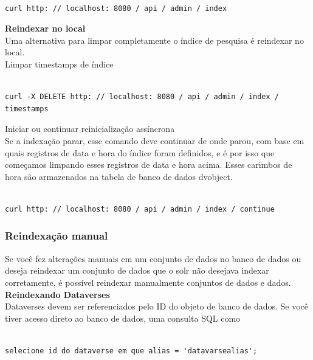 \documentclass[12pt,hidelinks]{article}
\begin{document}
\begin{verbatim}

curl http: // localhost: 8080 / api / admin / index

\end{verbatim}

\textbf{Reindexar no local}\\

Uma alternativa para limpar completamente o índice de pesquisa é reindexar no local.\\

Limpar timestamps de índice

\begin{verbatim}

curl -X DELETE http: // localhost: 8080 / api / admin / index / 
timestamps

\end{verbatim}

Iniciar ou continuar reinicialização assíncrona\\

Se a indexação parar, esse comando deve continuar de onde parou, com base em quais registros de data e hora do índice foram definidos, e é por isso que começamos limpando esses registros de data e hora acima. Esses carimbos de hora são armazenados na tabela de banco de dados dvobject.

\begin{verbatim}

curl http: // localhost: 8080 / api / admin / index / continue

\end{verbatim}

\subsubsection{Reindexação manual}

\qquad Se você fez alterações manuais em um conjunto de dados no banco de dados ou deseja reindexar um conjunto de dados que o solr não desejava indexar corretamente, é possível reindexar manualmente conjuntos de dados e dados.\\

\textbf{Reindexando Dataverses}\\

Dataverses devem ser referenciados pelo ID do objeto de banco de dados. Se você tiver acesso direto ao banco de dados, uma consulta SQL como

\begin{verbatim}

selecione id do dataverse em que alias = 'datavarsealias';

\end{verbatim}
\end{document}

